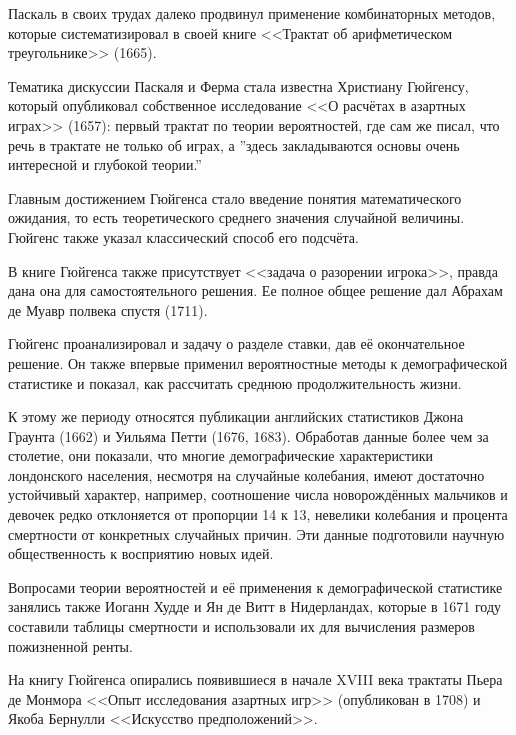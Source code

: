 \documentclass[12pt]{article}
\begin{document}
Паскаль в своих трудах далеко продвинул применение комбинаторных методов, которые систематизировал в своей книге <<Трактат об арифметическом треугольнике>> (1665). 

Тематика дискуссии Паскаля и Ферма стала известна Христиану Гюйгенсу, который опубликовал собственное исследование <<О расчётах в азартных играх>> (1657): первый трактат по теории вероятностей, где сам же писал, что речь в трактате не только об играх, а ''здесь закладываются основы очень интересной и глубокой теории.''

Главным достижением Гюйгенса стало введение понятия математического ожидания, то есть теоретического среднего значения случайной величины. Гюйгенс также указал классический способ его подсчёта.

В книге Гюйгенса также присутствует <<задача о разорении игрока>>, правда дана она для самостоятельного решения. Ее полное общее решение дал Абрахам де Муавр полвека спустя (1711). 

Гюйгенс проанализировал и задачу о разделе ставки, дав её окончательное решение. Он также впервые применил вероятностные методы к демографической статистике и показал, как рассчитать среднюю продолжительность жизни.

К этому же периоду относятся публикации английских статистиков Джона Граунта (1662) и Уильяма Петти (1676, 1683). Обработав данные более чем за столетие, они показали, что многие демографические характеристики лондонского населения, несмотря на случайные колебания, имеют достаточно устойчивый характер, например, соотношение числа новорождённых мальчиков и девочек редко отклоняется от пропорции 14 к 13, невелики колебания и процента смертности от конкретных случайных причин. 
Эти данные подготовили научную общественность к восприятию новых идей.

Вопросами теории вероятностей и её применения к демографической статистике занялись также Иоганн Худде и Ян де Витт в Нидерландах, которые в 1671 году составили таблицы смертности и использовали их для вычисления размеров пожизненной ренты. 

На книгу Гюйгенса опирались появившиеся в начале XVIII века трактаты Пьера де Монмора <<Опыт исследования азартных игр>> (опубликован в 1708) и Якоба Бернулли <<Искусство предположений>>.
\end{document}
